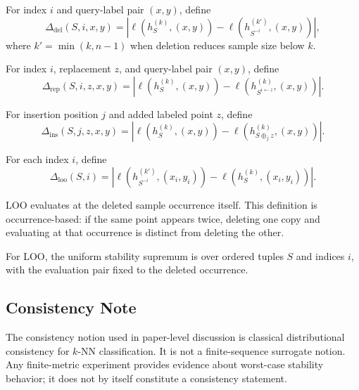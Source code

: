 \begin{definition}
For index $i$ and query-label pair $(x, y)$, define
\[
\Delta_{\mathrm{del}}(S, i, x, y)
=
\left| \ell(h_S^{(k)}, (x, y)) - \ell(h_{S^{-i}}^{(k')}, (x, y)) \right|,
\]
where $k' = \min(k, n-1)$ when deletion reduces sample size below $k$.
\end{definition}

\begin{definition}
For index $i$, replacement $z$, and query-label pair $(x, y)$, define
\[
\Delta_{\mathrm{rep}}(S, i, z, x, y)
=
\left| \ell(h_S^{(k)}, (x, y)) - \ell(h_{S^{i \leftarrow z}}^{(k)}, (x, y)) \right|.
\]
\end{definition}

\begin{definition}
For insertion position $j$ and added labeled point $z$, define
\[
\Delta_{\mathrm{ins}}(S, j, z, x, y)
=
\left| \ell(h_S^{(k)}, (x, y)) - \ell(h_{S \oplus_j z}^{(k)}, (x, y)) \right|.
\]
\end{definition}

\begin{definition}
For each index $i$, define
\[
\Delta_{\mathrm{loo}}(S, i)
=
\left| \ell(h_{S^{-i}}^{(k')}, (x_i, y_i)) - \ell(h_S^{(k)}, (x_i, y_i)) \right|.
\]
\end{definition}

LOO evaluates at the deleted sample occurrence itself. This definition is occurrence-based: if the same point appears twice, deleting one copy and evaluating at that occurrence is distinct from deleting the other.

For LOO, the uniform stability supremum is over ordered tuples $S$ and indices $i$, with the evaluation pair fixed to the deleted occurrence.

\subsection{Consistency Note}

The consistency notion used in paper-level discussion is classical distributional consistency for $k$-NN classification. It is not a finite-sequence surrogate notion. Any finite-metric experiment provides evidence about worst-case stability behavior; it does not by itself constitute a consistency statement.


